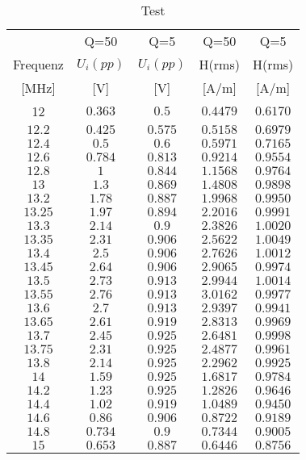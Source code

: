 \documentclass[12pt,a4paper,ngerman]{article}
\begin{document}
\begin{table}[H]
\begin{center}
\begin{tabular}{ |c|c|c|c|c| }
  \hline
     & Q=50 & Q=5 & Q=50 & Q=5\\
    Frequenz & $U_i(pp)$ & $U_i(pp)$ & H(rms) & H(rms)\\

  {[MHz]} & {[V]} & {[V]} & {[A/m]} & {[A/m]} \\
  \hline
  12 & $0.363$ & $0.5$ & $0.4479$ & $0.6170$ \\
  \hline
  $12.2$ & $0.425$ & $0.575$ & $0.5158$ & $0.6979$ \\
  \hline
  $12.4$ & $0.5$ & $0.6$ & $0.5971$ & $0.7165$ \\
  \hline
  $12.6$ & $0.784$ & $0.813$ & $0.9214$ & $0.9554$ \\
    \hline
  $12.8$ & $1$ & $0.844$ & $1.1568$ & $0.9764$ \\
    \hline
  $13$ & $1.3$ & $0.869$ & $1.4808$ & $0.9898$ \\
    \hline
  $13.2$ & $1.78$ & $0.887$ & $1.9968$ & $0.9950$ \\
     \hline
  $13.25$ & $1.97$ & $0.894$ & $2.2016$ & $0.9991$ \\ 
    \hline
  $13.3$ & $2.14$ & $0.9$ & $2.3826$ & $1.0020$ \\
    \hline
  $13.35$ & $2.31$ & $0.906$ & $2.5622$ & $1.0049$ \\
    \hline
  $13.4$ & $2.5$ & $0.906$ & $2.7626$ & $1.0012$ \\
    \hline
  $13.45$ & $2.64$ & $0.906$ & $2.9065$ & $0.9974$ \\
    \hline
  $13.5$ & $2.73$ & $0.913$ & $2.9944$ & $1.0014$ \\
     \hline
  $13.55$ & $2.76$ & $0.913$ & $3.0162$ & $0.9977$ \\
      \hline
  $13.6$ & $2.7$ & $0.913$ & $2.9397$ & $0.9941$ \\ 
      \hline
  $13.65$ & $2.61$ & $0.919$ & $2.8313$ & $0.9969$ \\
      \hline
  $13.7$ & $2.45$ & $0.925$ & $2.6481$ & $0.9998$ \\
      \hline
  $13.75$ & $2.31$ & $0.925$ & $2.4877$ & $0.9961$ \\
      \hline
  $13.8$ & $2.14$ & $0.925$ & $2.2962$ & $0.9925$ \\
      \hline
  $14$ & $1.59$ & $0.925$ & $1.6817$ & $0.9784$ \\
      \hline
  $14.2$ & $1.23$ & $0.925$ & $1.2826$ & $0.9646$ \\
      \hline
  $14.4$ & $1.02$ & $0.919$ & $1.0489$ & $0.9450$ \\
      \hline
  $14.6$ & $0.86$ & $0.906$ & $0.8722$ & $0.9189$ \\
      \hline
  $14.8$ & $0.734$ & $0.9$ & $0.7344$ & $0.9005$ \\
      \hline
  $15$ & $0.653$ & $0.887$ & $0.6446$ & $0.8756$ \\
      \hline
\end{tabular}
\caption{Test}
\end{center}
\end{table}
\end{document}
